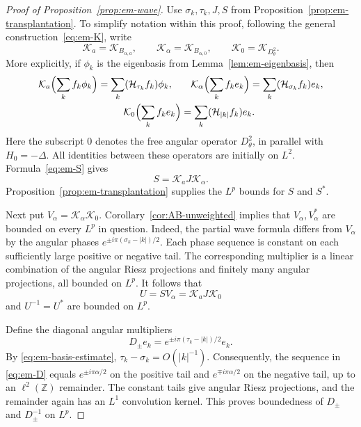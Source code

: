 \documentclass[10pt,a4paper]{amsart}
\newcommand{\HH}{\mathcal H}                 %
\newcommand{\Z}{\mathbb Z}
\begin{document}
\begin{proof}[Proof of Proposition~\ref{prop:em-wave}]
  Use $\sigma_k,\tau_k,J,S$ from
  Proposition~\ref{prop:em-transplantation}.
  To simplify notation within this proof,
  following the general construction~\eqref{eq:em-K}, write
  \begin{equation*}
    \mathcal K_a=\mathcal K_{B_{\alpha,a}},\qquad
    \mathcal K_\alpha=\mathcal K_{B_{\alpha,0}},\qquad
    \mathcal K_0=\mathcal K_{D_\theta^2}.
  \end{equation*}
  More explicitly, if $\phi_k$ is the eigenbasis from
  Lemma~\ref{lem:em-eigenbasis}, then
  \begin{equation*}
    \begin{aligned}
      \mathcal K_a\Bigl(\sum_k f_k\phi_k\Bigr)
        =\sum_k(\HH_{\tau_k}f_k)\phi_k,\quad & \quad
      \mathcal K_\alpha\Bigl(\sum_k f_ke_k\Bigr)
        =\sum_k(\HH_{\sigma_k}f_k)e_k,\\
      \mathcal K_0\Bigl(\sum_k f_ke_k\Bigr)
        &=\sum_k(\HH_{|k|}f_k)e_k.
    \end{aligned}
  \end{equation*}
  Here the subscript $0$ denotes the free angular operator
  $D_\theta^2$, in parallel with $H_0=-\Delta$.
  All identities between these operators are initially on
  $L^2$. Formula~\eqref{eq:em-S} gives
  \begin{equation*}
    S=\mathcal K_aJ\mathcal K_\alpha.
  \end{equation*}
  Proposition~\ref{prop:em-transplantation} supplies the
  $L^p$ bounds for $S$ and $S^*$.

  Next put $V_\alpha=\mathcal K_\alpha\mathcal K_0$.
  Corollary~\ref{cor:AB-unweighted} implies that
  $V_\alpha,V_\alpha^*$ are bounded on every $L^p$ in
  question. Indeed, the partial wave formula differs from
  $V_\alpha$ by the angular phases
  $e^{\pm i\pi(\sigma_k-|k|)/2}$. Each phase sequence is
  constant on each sufficiently large positive or negative
  tail. The corresponding multiplier is a linear combination
  of the angular Riesz projections and finitely many angular
  projections, all bounded on $L^p$. It follows that
  \begin{equation}\label{eq:em-U}
    U=SV_\alpha=\mathcal K_aJ\mathcal K_0
  \end{equation}
  and $U^{-1}=U^*$ are bounded on $L^p$.

  Define the diagonal angular multipliers
  \begin{equation}\label{eq:em-D}
    D_\pm e_k
    =e^{\pm i\pi(\tau_k-|k|)/2}e_k.
  \end{equation}
  By \eqref{eq:em-basis-estimate},
  $\tau_k-\sigma_k=O(|k|^{-1})$. Consequently, the sequence
  in \eqref{eq:em-D} equals
  $e^{\pm i\pi\alpha/2}$ on the positive tail and
  $e^{\mp i\pi\alpha/2}$ on the negative tail, up to an
  $\ell^2(\Z)$ remainder. The constant tails give angular
  Riesz projections, and the remainder again has an $L^1$
  convolution kernel. This proves boundedness of $D_\pm$
  and $D_\pm^{-1}$ on $L^p$.


\end{proof}
\end{document}
